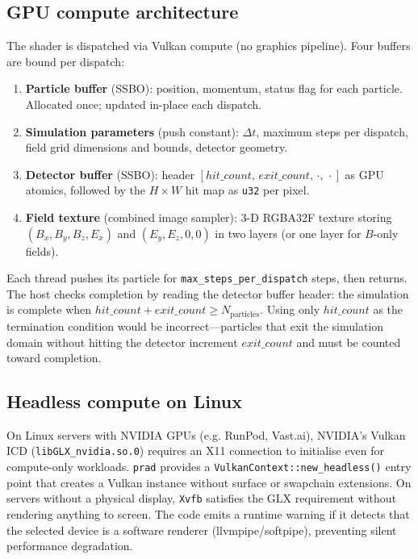 \documentclass[review,12pt]{elsarticle}
\begin{document}
\subsection{GPU compute architecture}

The shader is dispatched via Vulkan compute (no graphics pipeline). Four buffers
are bound per dispatch:

\begin{enumerate}
  \item \textbf{Particle buffer} (SSBO): position, momentum, status flag for each
    particle. Allocated once; updated in-place each dispatch.
  \item \textbf{Simulation parameters} (push constant): $\Delta t$, maximum steps per
    dispatch, field grid dimensions and bounds, detector geometry.
  \item \textbf{Detector buffer} (SSBO): header $[\mathit{hit\_count},\,\mathit{exit\_count},\,\cdot,\,\cdot]$
    as GPU atomics, followed by the $H \times W$ hit map as \texttt{u32} per pixel.
  \item \textbf{Field texture} (combined image sampler): 3-D RGBA32F texture storing
    $(B_x, B_y, B_z, E_x)$ and $(E_y, E_z, 0, 0)$ in two layers (or one layer for
    $B$-only fields).
\end{enumerate}

Each thread pushes its particle for \texttt{max\_steps\_per\_dispatch} steps, then
returns. The host checks completion by reading the detector buffer header: the
simulation is complete when $\mathit{hit\_count} + \mathit{exit\_count} \geq N_\mathrm{particles}$.
Using only $\mathit{hit\_count}$ as the termination condition would be incorrect—particles
that exit the simulation domain without hitting the detector increment $\mathit{exit\_count}$
and must be counted toward completion.

\subsection{Headless compute on Linux}

On Linux servers with NVIDIA GPUs (e.g. RunPod, Vast.ai), NVIDIA's Vulkan ICD
(\texttt{libGLX\_nvidia.so.0}) requires an X11 connection to initialise even for
compute-only workloads. \texttt{prad} provides a \texttt{VulkanContext::new\_headless()}
entry point that creates a Vulkan instance without surface or swapchain extensions.
On servers without a physical display, \texttt{Xvfb} satisfies the GLX requirement
without rendering anything to screen. The code emits a runtime warning if it detects
that the selected device is a software renderer (llvmpipe/softpipe), preventing
silent performance degradation.
\end{document}
